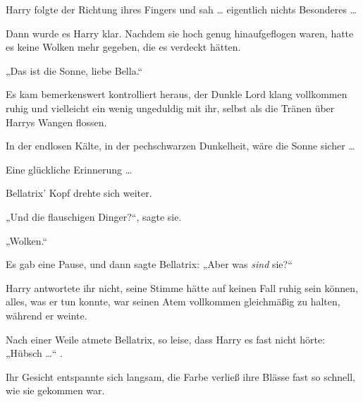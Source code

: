 Harry folgte der Richtung ihres Fingers und sah … eigentlich nichts Besonderes …

Dann wurde es Harry klar. Nachdem sie hoch genug hinaufgeflogen waren, hatte es keine Wolken mehr gegeben, die es verdeckt hätten.

„Das ist die Sonne, liebe Bella.“

Es kam bemerkenswert kontrolliert heraus, der Dunkle Lord klang vollkommen ruhig und vielleicht ein wenig ungeduldig mit ihr, selbst als die Tränen über Harrys Wangen flossen.

In der endlosen Kälte, in der pechschwarzen Dunkelheit, wäre die Sonne sicher …

Eine glückliche Erinnerung …

Bellatrix’ Kopf drehte sich weiter.

„Und die flauschigen Dinger?“, sagte sie.

„Wolken.“

Es gab eine Pause, und dann sagte Bellatrix:
„Aber was \emph{sind} sie?“

Harry antwortete ihr nicht, seine Stimme hätte auf keinen Fall ruhig sein können, alles, was er tun konnte, war seinen Atem vollkommen gleichmäßig zu halten, während er weinte.

Nach einer Weile atmete Bellatrix, so leise, dass Harry es fast nicht hörte:
„Hübsch …“ .

Ihr Gesicht entspannte sich langsam, die Farbe verließ ihre Blässe fast so schnell, wie sie gekommen war.

